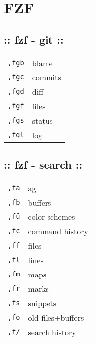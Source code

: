 \section{\hrulefill FZF\hrulefill}
\subsection{:: fzf - git ::}
\begin{tabular}{@{}ll@{}}
    \verb!,fgb!     & blame \\
    \verb!,fgc!     & commits \\
    \verb!,fgd!     & diff \\
    \verb!,fgf!     & files \\
    \verb!,fgs!     & status \\
    \verb!,fgl!     & log \\
\end{tabular}

\subsection{:: fzf - search ::}
\begin{tabular}{@{}ll@{}}
    \verb!,fa!      & ag \\
    \verb!,fb!      & buffers \\
    \verb!,fü!      & color schemes \\
    \verb!,fc!      & command history \\
    \verb!,ff!      & files \\
    \verb!,fl!      & lines \\
    \verb!,fm!      & maps \\
    \verb!,fr!      & marks \\
    \verb!,fs!      & snippets \\
    \verb!,fo!      & old files+buffers \\
    \verb!,f/!      & search history \\
\end{tabular}

